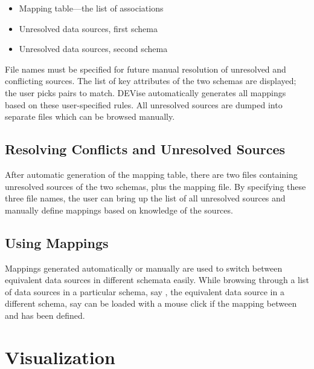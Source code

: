\begin{itemize}
	\item Mapping table---the list of associations
	\item Unresolved data sources, first schema 
	\item Unresolved data sources, second schema
\end{itemize}

File names must be specified for future manual resolution of unresolved and
conflicting sources. The list of key attributes of the two schemas are
displayed; the user picks pairs to match.  DEVise automatically generates all
mappings based on these user-specified rules. All unresolved sources are dumped
into separate files which can be browsed manually.


\subsection{Resolving Conflicts and Unresolved Sources}

After automatic generation of the mapping table, there are two files containing
unresolved sources of the two schemas, plus the mapping file. By specifying
these three file names, the user can bring up the list of all unresolved sources
and manually define mappings based on knowledge of the sources.


\subsection{Using Mappings}

Mappings generated automatically or manually are used to switch
between equivalent data sources in different schemata easily. While browsing
through a list of data sources in a particular schema, say , the
equivalent data source in a different schema, say  can be loaded
with a mouse click if the mapping between  and  has been
defined.


\section{Visualization}

